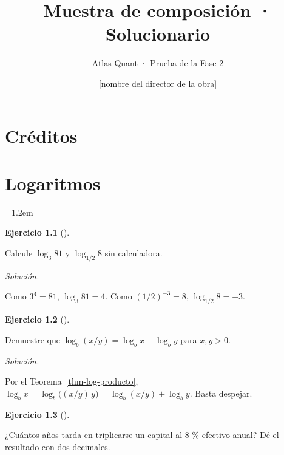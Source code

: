 \documentclass[
  spanish,
  letterpaper,
  a4paper,
  11pt,
  oneside,
  numbers=noenddot]{scrbook}
\title{Muestra de composición · Solucionario}
\subtitle{Atlas Quant · Prueba de la Fase 2}
\author{{[}nombre del director de la obra{]}}
\date{}
\newenvironment{atlasnota}{\par\medskip\begin{list}{}{\leftmargin=1.2em\rightmargin=0pt}\item\relax}{\end{list}\medskip}
\renewcommand*\contentsname{Tabla de contenidos}
\newcommand\contentsname{Tabla de contenidos}
\theoremstyle{plain}
\theoremstyle{plain}
\theoremstyle{definition}
\newtheorem{exercise}{Ejercicio}[chapter]
\theoremstyle{definition}
\theoremstyle{definition}
\theoremstyle{remark}
\begin{document}
\frontmatter
\maketitle

\renewcommand*\contentsname{Tabla de contenidos}
{
\setcounter{tocdepth}{1}
\tableofcontents
}

\mainmatter
{}

\chapter*{Créditos}\label{cruxe9ditos}



\chapter{Logaritmos}\label{sec-logaritmos}

\begin{atlasnota}

\end{atlasnota}

\begin{exercise}[]\protect\hypertarget{exr-log-1}{}\label{exr-log-1}

Calcule \(\log_{3} 81\) y \(\log_{1/2} 8\) sin calculadora.

\end{exercise}

\emph{Solución.}

Como \(3^{4} = 81\), \(\log_{3} 81 = 4\). Como \((1/2)^{-3} = 8\),
\(\log_{1/2} 8 = -3\).

\begin{exercise}[]\protect\hypertarget{exr-log-2}{}\label{exr-log-2}

Demuestre que \(\log_b (x / y) = \log_b x - \log_b y\) para
\(x, y > 0\).

\end{exercise}

\emph{Solución.}

Por el Teorema~\ref{thm-log-producto},
\(\log_b x = \log_b\bigl((x/y) \, y\bigr) = \log_b (x/y) + \log_b y\).
Basta despejar.

\begin{exercise}[]\protect\hypertarget{exr-log-3}{}\label{exr-log-3}

¿Cuántos años tarda en triplicarse un capital al \(8\) \% efectivo
anual? Dé el resultado con dos decimales.

\end{exercise}
\end{document}
